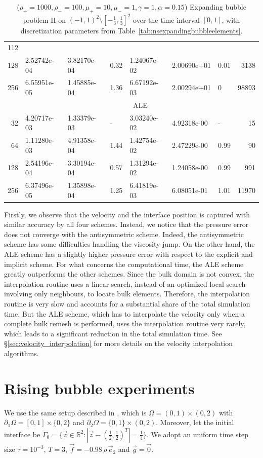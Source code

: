 \documentclass[a4paper,12pt,onecolumn]{article}
\newcommand{\R}{\mathbb R}
\begin{document}
\begin{table}
\begin{tabular}{rllllllr}
112 \\
128 & 2.52742e-04 & 3.82170e-04 & 0.32 & 1.24067e-02 & 2.00690e+01 & 0.01 &
3138 \\
256 & 6.55951e-05 & 1.45885e-04 & 1.36 & 6.67192e-03 & 2.00294e+01 &    0 &
98893 \\
\hline
& \multicolumn{7}{c}{ALE} \\
\hline
 32 & 4.20717e-03 & 1.33379e-03 &    - & 3.03240e-02 & 4.92318e-00 &    - &
15 \\
 64 & 1.11280e-03 & 4.91358e-04 & 1.44 & 1.42754e-02 & 2.47229e-00 & 0.99 &
90 \\
128 & 2.54196e-04 & 3.30194e-04 & 0.57 & 1.31294e-02 & 1.24058e-00 & 0.99 &
991 \\
256 & 6.37496e-05 & 1.35898e-04 & 1.25 & 6.41819e-03 & 6.08051e-01 & 1.01 &
11970 \\
\hline
\end{tabular}
\hspace*{-3.25cm}
\caption[Navier--Stokes expanding bubble II errors]
{($\rho_+ = 1000,\rho_- = 100,\mu_+ = 10,\mu_- =1,\gamma = 1,\alpha=0.15$)
Expanding bubble problem II on $(-1,1)^2\setminus[-\frac{1}{3},\frac{1}{3}]^2$
over the time interval $[0,1]$, with discretization parameters from
Table~\ref{tab:nsexpandingbubbleelements}.}
\label{tab:nsexpandingbubbleIIp2p1p0}
\end{table}
Firstly, we observe that the velocity and the interface position is captured
with similar accuracy by all four schemes. Instead, we notice that the
pressure error does not converge with the antisymmetric scheme. Indeed, the
antisymmetric scheme has some difficulties handling the viscosity jump. On the
other hand, the ALE scheme has a slightly higher pressure error with respect
to the explicit and implicit scheme. For what concerns the computational time,
the ALE scheme greatly outperforms the other schemes. Since the bulk domain is
not convex, the interpolation routine uses a linear search, instead of an
optimized local search involving only neighbours, to locate bulk elements.
Therefore, the interpolation routine is very slow and accounts for a
substantial share of the total simulation time. But the ALE scheme, which has
to interpolate the velocity only when a complete bulk remesh is performed, uses
the interpolation routine very rarely, which leads to a significant reduction
in the total simulation time. See \S\ref{sec:velocity_interpolation} for more
details on the velocity interpolation algorithms.

\section{Rising bubble experiments}\label{sec:2d_rising_bubble_results}
We use the same  setup described in \cite[Figure~2]{HysingTKPBGT09}, which is
$\Omega = (0,1) \times (0,2)$ with $\partial_1\Omega = [0,1] \times \{0,2\}$
and $\partial_2\Omega = \{0,1\} \times (0,2)$. Moreover, let the initial
interface be $\Gamma_0 = \{\vec z \in \R^2 : |\vec z - (\frac{1}{2},
\frac{1}{2})^T| = \frac{1}{4}\}$.  We adopt an uniform time step size
$\tau=10^{-3}$, $T=3$, $\vec f = -0.98\,\rho\,\vec e_2$ and $\vec g=\vec 0$.
\end{document}
